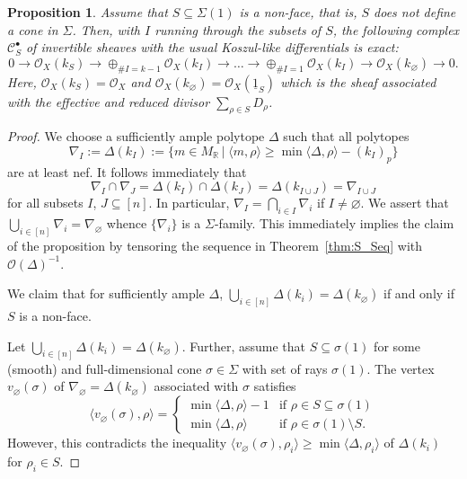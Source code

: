 \documentclass[11pt]{article}
\newtheorem{prop}[theo]{Proposition}
\theoremstyle{definition}
\numberwithin{equation}{section}
\newcommand{\R}{\mathbb R}
\newcommand{\CC}{{\mathcal C}}
\newcommand{\CO}{{\mathcal O}}
\newcommand{\kst }{\,|\;}
\newcommand{\ku}{\underline}
\newcommand{\kss}{\scriptscriptstyle}
\newcommand{\kbb}{{\kss \bullet}}
\renewcommand{\sharp}{\#}
\begin{document}
\begin{prop}
\label{prop:Resol}
Assume that $S\subseteq\Sigma(1)$ is a non-face, 
that is, $S$ does not define a cone in $\Sigma$.
Then, with $I$ running through the subsets of $S$,
the following complex $\CC_S^\kbb$ of invertible 
sheaves with the usual Koszul-like differentials 
is exact:
$$
0\to\CO_X(k_S)\to 
\oplus_{\sharp I=k-1} \CO_X(k_I) \to\ldots\to
\oplus_{\sharp I=1} \CO_X(k_I) \to \CO_X(k_\varnothing)\to 0.
$$
Here, $\CO_X(k_S)=\CO_X$ and $\CO_X(k_\varnothing)=
\CO_X(\ku{1}_S)$ which is the sheaf associated with 
the effective and reduced divisor 
$\sum_{\rho\in S}D_\rho$.
\end{prop}

\begin{proof}
We choose a sufficiently ample polytope $\Delta$ 
such that all polytopes
$$
\nabla_{\! I}:=\Delta(k_I):=\{m\in M_{\R}\kst
\langle m,\rho\rangle \geq\min
\langle\Delta,\rho\rangle-(k_I)_p\}
$$
are at least nef. It follows immediately that
$$
\nabla_{\! I}\cap\nabla_{\! J}=\Delta(k_I)\cap 
\Delta(k_{J})=\Delta(k_{I\cup J})=\nabla_{\!I\cup J}
$$
for all subsets $I$, $J\subseteq[n]$. In particular, 
$\nabla_{\! I}=\bigcap_{i\in I}\nabla_{\! i}$ if
$I\not=\varnothing$. We assert that 
$\bigcup_{i\in[n]}\nabla_{\! i}=\nabla_{\!\varnothing}$
whence $\{\nabla_{\! i}\}$ is a $\Sigma$-family.
This immediately implies the claim of the proposition 
by tensoring the sequence in Theorem~\ref{thm:S_Seq} 
with $\CO(\Delta)^{-1}$.

We claim that for sufficiently ample $\Delta$, 
$\bigcup_{i\in[n]}\Delta(k_i)=\Delta(k_{\varnothing})$ 
if and only if $S$ is a non-face.

Let $\bigcup_{i\in[n]}\Delta(k_i)=\Delta(k_{\varnothing})$.
Further, assume that $S\subseteq\sigma(1)$ for some 
(smooth) and full-dimensional cone $\sigma\in\Sigma$ 
with set of rays $\sigma(1)$. The vertex 
$v_{\varnothing}(\sigma)$ of 
$\nabla_{\!\varnothing}=\Delta(k_{\varnothing})$
associated with $\sigma$ satisfies
$$
\langle v_{\varnothing}(\sigma),\rho\rangle=
\left\{\begin{array}{ll}
\min\langle\Delta,\rho\rangle-1 & 
\mbox{if }\rho\in S\subseteq\sigma(1)\\
\min\langle\Delta,\rho\rangle & 
\mbox{if }\rho\in \sigma(1)\setminus S.
\end{array}\right.
$$
However, this contradicts the inequality 
$\langle v_{\varnothing}(\sigma),\rho_i\rangle\geq 
\min\langle\Delta,\rho_i\rangle$
of $\Delta(k_i)$ for $\rho_i\in S$.


\end{proof}
\end{document}
